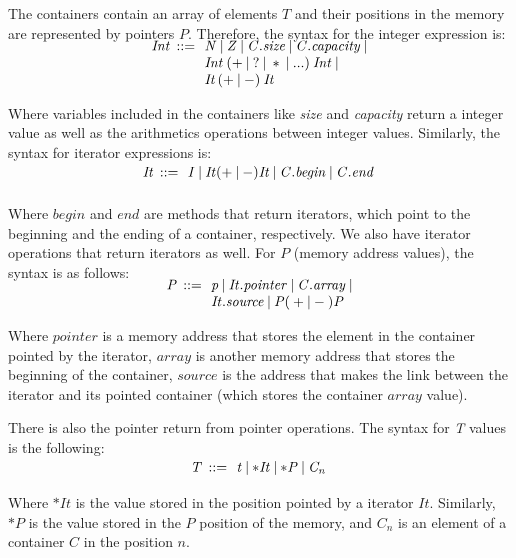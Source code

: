 \documentclass[a4paper]{llncs}
\begin{document}
The containers contain an array of elements $T$ and their
positions in the memory are represented by pointers $P$.
Therefore, the syntax for the integer expression is:
%
\[\begin{array}{r@{\:\:}c@{\:\:}l}
\\[-5ex]
\mathit{Int}  & ::= & \: \mathit{N} \: | \: \mathit{Z} \: | \: \mathit{C.size} \: | \: \mathit{C.capacity} \: | \\
              &     & \: \mathit{Int} \: ( + \: | \: ? \: | \: * \: | \: ...) \: \mathit{Int}  \: | \\
              &     & \: \textit{It} \: ( + \: | \: - ) \:  \textit{It}
\end{array}
\]

Where variables included in the containers
like \emph{size} and \emph{capacity} return
a integer value as well as the arithmetics
operations between integer values.
Similarly, the syntax for iterator
expressions is:
%
\[\begin{array}{r@{\:\:}c@{\:\:}l}\label{iterator-semantics}
\\[-5ex]
\mathit{It}   & ::= & \: \mathit{I} \: | \: \mathit{It} ( + \: | \: - ) \mathit{It} \: | \: \mathit{C.begin} \: | \: \mathit{C.end} \:  \\
\end{array}
\]

Where $begin$ and $end$ are methods
that return iterators, which point to the beginning
and the ending of a container, respectively. We also have
iterator operations that return iterators as well.
For $P$ (memory address values), the syntax is as follows:
%
\[\begin{array}{r@{\:\:}c@{\:\:}l}\label{pointer-semantics}
\\[-5ex]
\mathit{P}  & ::= & \: \mathit{p} \: | \: \mathit{It.pointer} \: | \: \mathit{C.array} \: | \\
            &     & \: \mathit{It.source} \: | \: \mathit{P}  ( \: + \: | \: - \: )  \textit{P} \: \\
\end{array}
\]

Where $pointer$ is a memory address that stores the element
in the container pointed by the iterator, $array$ is another
memory address that stores the beginning of the container,
$source$ is the address that makes the link between the iterator
and its pointed container (which stores the container $array$ value).

There is also the pointer return from pointer operations.
The syntax for \emph{T} values is the following:
%
\[\begin{array}{r@{\:\:}c@{\:\:}l}\label{element-semantics}
\\[-5ex]
\mathit{T}   & ::= & \: \mathit{t} \: | \: \mathit{*It} \: | \: \mathit{*P} \: | \: \mathit{C_n} \:  \\
\end{array}
\]
%
Where $*It$ is the value stored in the position pointed
by a iterator $It$. Similarly, $*P$ is the value stored
in the $P$ position of the memory, and $\mathit{C_n}$ is
an element of a container $C$ in the position $n$.
\end{document}
